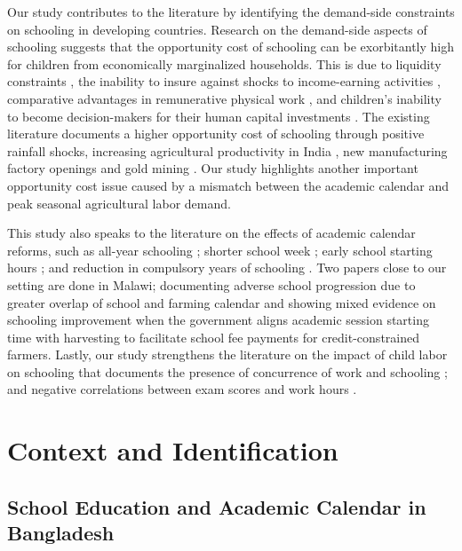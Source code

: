 \documentclass[12pt,letterpaper]{article}
\newcommand{\0}{\ensuremath{\mbox{\boldmath $0$}}}
\begin{document}
Our study contributes to the literature by identifying the demand-side constraints on schooling in developing countries. Research on the demand-side aspects of schooling suggests that the opportunity cost of schooling can be exorbitantly high for children from economically marginalized households. This is due to liquidity constraints  \citep{JacobySkoufias1997, BeegleDehejiaGatti2006}, the inability to insure against shocks to income-earning activities \citep{Jensen2000, deJanvryetal2006, Case2006}, comparative advantages in remunerative physical work \citep{PittRosenzweigHassan2010}, and children's inability to become decision-makers for their human capital investments \citep{BalandRobinson2000}. The existing literature documents a higher opportunity cost of schooling through positive rainfall shocks, increasing agricultural productivity in India \citep{shah2017drought}, new manufacturing factory openings \citep{atkin2016endogenous} and gold mining \citep{santos2018blessing}. Our study highlights another important opportunity cost issue caused by a mismatch between the academic calendar and peak seasonal agricultural labor demand.

This study also speaks to the literature on the effects of academic calendar reforms, such as all-year schooling \citep{ mcmullen2012impact, graves2010academic}; shorter school week \citep{anderson2015does}; early school starting hours \citep{cortes2012role,  hinrichs2011bell, edwards2012early, carrell2011s}; and reduction in compulsory years of schooling \citep{elsayed2021less}. Two papers close to our setting are done in Malawi; \cite{allen2024double} documenting adverse school progression due to greater overlap of school and farming calendar and \cite{dillon2021selling} showing mixed evidence on schooling improvement when the government aligns academic session starting time with harvesting to facilitate school fee payments for credit-constrained farmers. Lastly, our study strengthens the literature on the impact of child labor on schooling that documents the presence of concurrence of work and schooling \citep{RavallionWodon2000, Edmonds2007, Dumas2012}; and negative correlations between exam scores and work hours \citep{AkabayashiPsacharopoulos1999, Heady2003, Gunnarsson2006}.


\section{Context and Identification\label{sec.id}}
\subsection{School Education and Academic Calendar in Bangladesh}
\end{document}
